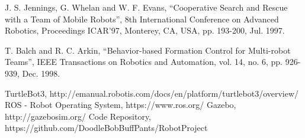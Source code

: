 \documentclass[letterpaper, 10 pt, conference]{ieeeconf}  %
\begin{document}

\begin{thebibliography}{99}

 J. S. Jennings, G. Whelan and W. F. Evans, ``Cooperative Search and Rescue with a Team of Mobile Robots'', 8th International Conference on Advanced Robotics, Proceedings ICAR'97, Monterey, CA, USA, pp. 193-200, Jul. 1997.

 T. Balch and R. C. Arkin, ``Behavior-based Formation Control for Multi-robot Teams'', IEEE Transactions on Robotics and Automation, vol. 14, no. 6, pp. 926-939, Dec. 1998.

 TurtleBot3, http://emanual.robotis.com/docs/en/platform/turtlebot3/overview/
 ROS - Robot Operating System, https://www.ros.org/
 Gazebo, http://gazebosim.org/
 Code Repository, https://github.com/DoodleBobBuffPants/RobotProject

\end{thebibliography}
\end{document}
